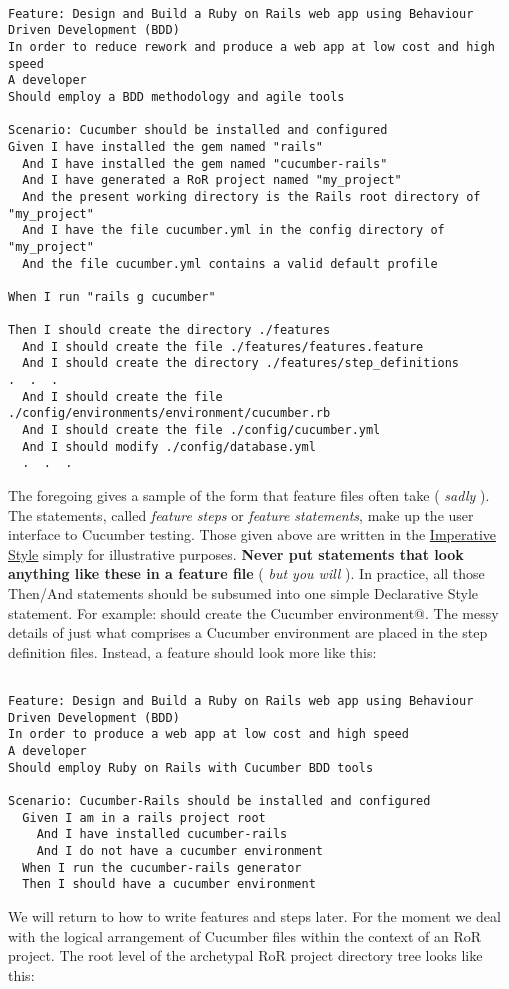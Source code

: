\begin{verbatim}

Feature: Design and Build a Ruby on Rails web app using Behaviour Driven Development (BDD)
In order to reduce rework and produce a web app at low cost and high speed
A developer 
Should employ a BDD methodology and agile tools

Scenario: Cucumber should be installed and configured
Given I have installed the gem named "rails"
  And I have installed the gem named "cucumber-rails"
  And I have generated a RoR project named "my_project"
  And the present working directory is the Rails root directory of "my_project"
  And I have the file cucumber.yml in the config directory of "my_project"
  And the file cucumber.yml contains a valid default profile

When I run "rails g cucumber"

Then I should create the directory ./features
  And I should create the file ./features/features.feature
  And I should create the directory ./features/step_definitions
.  .  .
  And I should create the file ./config/environments/environment/cucumber.rb
  And I should create the file ./config/cucumber.yml
  And I should modify ./config/database.yml
  .  .  .

\end{verbatim}
The foregoing gives a sample of the form that feature files often take ( \emph{sadly} ).  The statements, called \emph{feature steps} or \emph{feature statements}, make up the user interface to Cucumber testing.  Those given above are written in the \href{http://www.benmabey.com/2008/05/19/imperative-vs-declarative-scenarios-in-user-stories/}{Imperative Style} simply for illustrative purposes.  \textbf{Never put statements that look anything like these in a feature file} ( \emph{but you will} ).  In practice, all those Then/And statements should be subsumed into one simple Declarative Style statement. For example: \verb@I should create the Cucumber environment@. The messy details of just what comprises a Cucumber environment are placed in the step definition files.  Instead, a feature should look more like this:

\begin{verbatim}

Feature: Design and Build a Ruby on Rails web app using Behaviour Driven Development (BDD)
In order to produce a web app at low cost and high speed
A developer 
Should employ Ruby on Rails with Cucumber BDD tools

Scenario: Cucumber-Rails should be installed and configured
  Given I am in a rails project root
    And I have installed cucumber-rails
    And I do not have a cucumber environment
  When I run the cucumber-rails generator
  Then I should have a cucumber environment

\end{verbatim}
We will return to how to write features and steps later.  For the moment we deal with the logical arrangement of Cucumber files within the context of an RoR project.  The root level of the archetypal RoR project directory tree looks like this:

